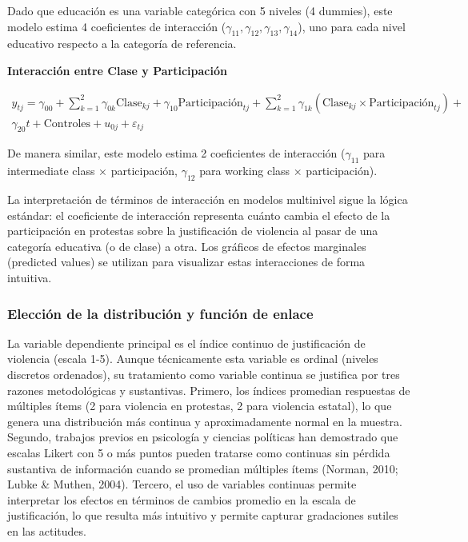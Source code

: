 \documentclass[
  13pt,
]{article}
\begin{document}
Dado que educación es una variable categórica con 5 niveles (4 dummies),
este modelo estima 4 coeficientes de interacción
(\(\gamma_{11}, \gamma_{12}, \gamma_{13}, \gamma_{14}\)), uno para cada
nivel educativo respecto a la categoría de referencia.

\textbf{Interacción entre Clase y Participación}

\[
\begin{aligned}
y_{tj} = \gamma_{00} + \sum_{k=1}^{2} \gamma_{0k} \text{Clase}_{kj} + \gamma_{10} \text{Participación}_{tj} + \sum_{k=1}^{2} \gamma_{1k} (\text{Clase}_{kj} \times \text{Participación}_{tj}) + \\
\gamma_{20} t + \text{Controles} + u_{0j} + \varepsilon_{tj}
\end{aligned}
\]

De manera similar, este modelo estima 2 coeficientes de interacción
(\(\gamma_{11}\) para intermediate class × participación,
\(\gamma_{12}\) para working class × participación).

La interpretación de términos de interacción en modelos multinivel sigue
la lógica estándar: el coeficiente de interacción representa cuánto
cambia el efecto de la participación en protestas sobre la justificación
de violencia al pasar de una categoría educativa (o de clase) a otra.
Los gráficos de efectos marginales (predicted values) se utilizan para
visualizar estas interacciones de forma intuitiva.

\subsubsection{Elección de la distribución y función de
enlace}\label{elecciuxf3n-de-la-distribuciuxf3n-y-funciuxf3n-de-enlace}

La variable dependiente principal es el índice continuo de justificación
de violencia (escala 1-5). Aunque técnicamente esta variable es ordinal
(niveles discretos ordenados), su tratamiento como variable continua se
justifica por tres razones metodológicas y sustantivas. Primero, los
índices promedian respuestas de múltiples ítems (2 para violencia en
protestas, 2 para violencia estatal), lo que genera una distribución más
continua y aproximadamente normal en la muestra. Segundo, trabajos
previos en psicología y ciencias políticas han demostrado que escalas
Likert con 5 o más puntos pueden tratarse como continuas sin pérdida
sustantiva de información cuando se promedian múltiples ítems (Norman,
2010; Lubke \& Muthen, 2004). Tercero, el uso de variables continuas
permite interpretar los efectos en términos de cambios promedio en la
escala de justificación, lo que resulta más intuitivo y permite capturar
gradaciones sutiles en las actitudes.
\end{document}
